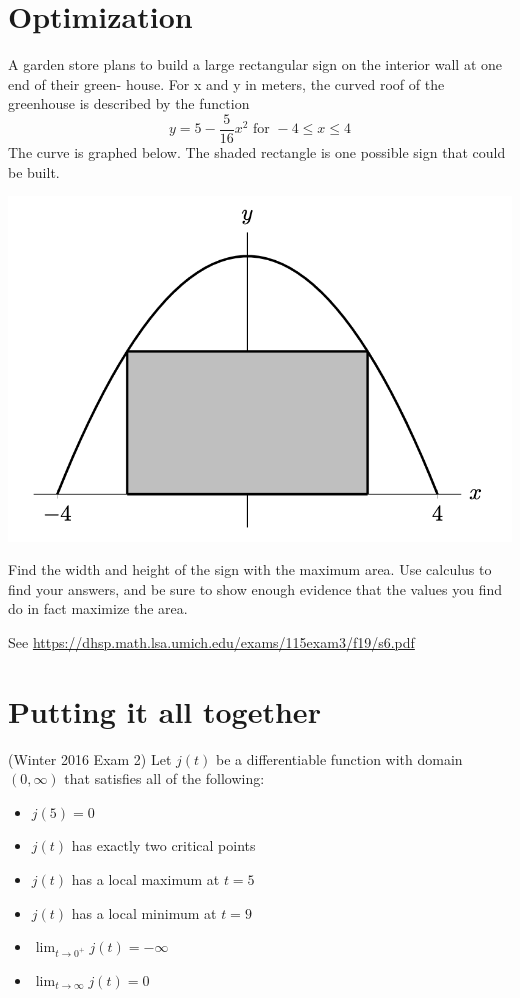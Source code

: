 \documentclass[11pt]{exam}
\begin{document}
\begin{questions}
\section*{Optimization}
\vspace{-0.25in}
\question A garden store plans to build a large rectangular
sign on the interior wall at one end of their green-
house. For x and y in meters, the curved roof of the
greenhouse is described by the function \[
  y = 5 - \frac{5}{16} x^2 \text{ for } -4 \leq x \leq 4
\]
The curve is graphed below. The shaded rectangle is one possible sign
that could be built.
\begin{center}
  \includegraphics[scale=0.5]{greenhouse}
\end{center}

Find the width and height of the sign with the maximum area. Use
calculus to find your answers, and be sure to show enough evidence
that the values you find do in fact maximize the area.
\begin{solution}
  See \href{https://dhsp.math.lsa.umich.edu/exams/115exam3/f19/s6.pdf}{https://dhsp.math.lsa.umich.edu/exams/115exam3/f19/s6.pdf}
\end{solution}
\section*{Putting it all together}
\question (Winter 2016 Exam 2) %
Let \(j(t)\) be a differentiable function with domain \((0, \infty)\) that satisfies all of the following:
\begin{itemize}
\item \(j(5) = 0\)
\item \(j(t)\) has exactly two critical points
\item \(j(t)\) has a
  local maximum at \(t = 5\)
\item \(j(t)\) has a local minimum at \(t = 9\)
\item \(\lim_{t \to 0^+} j(t) = -\infty\)
\item \(\lim_{t \to \infty} j(t) = 0\)
\end{itemize}
\begin{parts}

\end{parts}
\end{questions}
\end{document}
